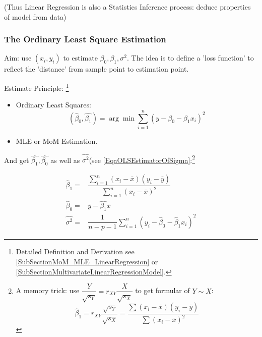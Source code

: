     
    (Thus Linear Regression is also a Statistics Inference process: deduce properties of model from data)
        
\subsubsection{The Ordinary Least Square Estimation}
    Aim: use $ (x_i,y_i) $  to estimate $ \beta _0,\beta _1,\sigma^2 $. The idea is to define a 'loss function' to reflect the 'distance' from sample point to estimation point.

    Estimate Principle: \footnote{Detailed Definition and Derivation see \autoref{SubSectionMoM_MLE_LinearRegression} or \autoref{SubSectionMultivariateLinearRegressionModel}.}
    \begin{itemize}[topsep=2pt,itemsep=2pt]
        \item Ordinary Least Squares:
        \begin{equation}
            (\hat{\beta  }_0,\hat{\beta _1})=\arg\min\sum_{i=1}^n (y-\beta _0-\beta _1x_i)^2
        \end{equation}
        \item MLE or MoM Estimation.
    \end{itemize}
    

    
    And get $ \hat{\beta _1},\hat{\beta _0}$ as well as $ \hat{\sigma^2} $(see \autoref{EqaOLSEstimatorOfSigma}:\footnote{A memory trick: use $ \dfrac{Y}{\sqrt{s_Y}}=r_{XY}\dfrac{X}{\sqrt{s_X}} $ to get formular of $ Y\sim X $:
    \begin{equation}
        \hat{\beta }_1=r_{XY}\dfrac{\sqrt{s_Y}}{\sqrt{s_X}}=\dfrac{{\displaystyle\sum (x_i-\bar{x})(y_i-\bar{y})}}{{\displaystyle\sum (x_i-\bar{x})^2}} 
    \end{equation}}

\begin{equation}\label{EqaOLSEstimatorOfBeta}
    \begin{aligned}
        \hat{\beta }_1=&\dfrac{\sum\limits_{i=1}^n (x_i-\bar{x})(y_i-\bar{y})}{\sum\limits_{i=1}^n (x_i-\bar{x})^2}\\
        \hat{\beta }_0=&\bar{y}-\hat{\beta _1}\bar{x}\\
        \hat{\sigma^2}=&\dfrac{1}{n-p-1}\sum_{i=1}^n(y_i-\hat{\beta }_0-\hat{\beta }_1x_i)^2
    \end{aligned}
\end{equation}


